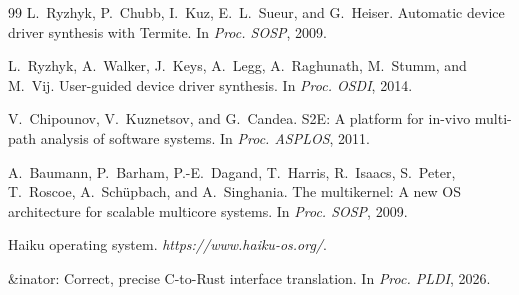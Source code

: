 \documentclass[sigplan, screen, review, anonymous]{acmart}
\begin{document}
\begin{thebibliography}{99}
L.~Ryzhyk, P.~Chubb, I.~Kuz, E.~L.~Sueur, and G.~Heiser.
\newblock Automatic device driver synthesis with Termite.
\newblock In \emph{Proc. SOSP}, 2009.

L.~Ryzhyk, A.~Walker, J.~Keys, A.~Legg, A.~Raghunath, M.~Stumm, and M.~Vij.
\newblock User-guided device driver synthesis.
\newblock In \emph{Proc. OSDI}, 2014.

V.~Chipounov, V.~Kuznetsov, and G.~Candea.
\newblock S2E: A platform for in-vivo multi-path analysis of software systems.
\newblock In \emph{Proc. ASPLOS}, 2011.

A.~Baumann, P.~Barham, P.-E.~Dagand, T.~Harris, R.~Isaacs, S.~Peter, T.~Roscoe, A.~Schüpbach, and A.~Singhania.
\newblock The multikernel: A new OS architecture for scalable multicore systems.
\newblock In \emph{Proc. SOSP}, 2009.

\newblock Haiku operating system.
\newblock \emph{https://www.haiku-os.org/}.

\newblock \&inator: Correct, precise C-to-Rust interface translation.
\newblock In \emph{Proc. PLDI}, 2026.

\end{thebibliography}
\end{document}
